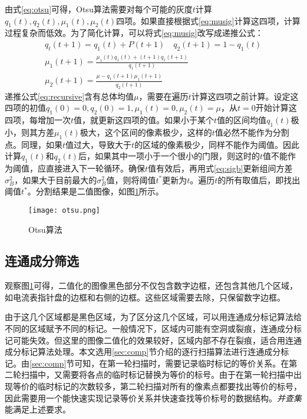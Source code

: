 由式\eqref{eq:otsu}可得，Otsu算法需要对每个可能的灰度$t$计算$q_1(t),q_2(t),\mu_1(t),\mu_2(t)$四项。如果直接根据式\eqref{eq:musig}计算这四项，计算过程复杂而低效。为了简化计算，可以将式\eqref{eq:musig}改写成递推公式：
\begin{equation}
  \label{eq:recursive}
  \begin{aligned}
    q_t(t+1)=q_1(t)+P(t+1)\quad q_2(t+1)=1-q_1(t) \\
    \mu_1(t+1)=\frac{\mu_1(t)q_1(t)+(t+1)q_1(t+1)}{q_1(t+1)} \\
    \mu_2(t+1)=\frac{\mu-q_1(t+1)\mu_1(t+1)}{q_2(t+1)}
  \end{aligned}
\end{equation}
递推公式\eqref{eq:recursive}含有总体均值$\mu$，需要在遍历$t$计算这四项之前计算。设定这四项的初值$q_1(0)=0,q_2(0)=1,\mu_1(t)=0,\mu_2(t)=\mu$，从$t=0$开始计算这四项，每增加一次$t$值，就更新这四项的值。如果小于某个$t$值的区间均值$q_1(t)$极小，则其方差$\mu_1(t)$极大，这个区间的像素极少，这样的$t$值必然不能作为分割点。同理，如果$t$值过大，导致大于$t$的区域的像素极少，同样不能作为阈值。因此计算$q_1(t)$和$q_2(t)$后，如果其中一项小于一个很小的门限，则这时的$t$值不能作为阈值，应直接进入下一轮循环。确保$t$值有效后，再用式\eqref{eq:sigb}更新组间方差$\sigma_B^2$，如果大于目前最大的$\sigma_B^2$值，则将阈值$t^{*}$更新为$t$。遍历$t$的所有取值后，即找出阈值$t^{*}$。分割结果是二值图像，如图\ref{fig:otsu}所示。

\begin{figure}[h]
  \centering
  \texttt{[image: otsu.png]}
  \caption{Otsu算法}
  \label{fig:otsu}
\end{figure}

\subsection{连通成分筛选}

观察图\ref{fig:otsu}可得，二值化的图像黑色部分不仅包含数字边框，还包含其他几个区域，如电流表指针盘的边框和右侧的边框。这些区域需要去除，只保留数字边框。


由于这几个区域都是黑色区域，为了区分这几个区域，可以用连通成分标记算法给不同的区域赋予不同的标记。一般情况下，区域内可能有空洞或裂痕，连通成分标记可能失效。但这里的图像二值化的效果较好，区域内部不存在裂痕，适合用连通成分标记算法处理。本文选用\ref{sec:comp}节介绍的逐行扫描算法进行连通成分标记。由\ref{sec:comp}节可知，在第一轮扫描时，需要记录临时标记的等价关系。在第二轮扫描中，又需要将各点的临时标记替换为等价的标号。由于在第一轮扫描中出现等价的临时标记的次数较多，第二轮扫描对所有的像素点都要找出等价的标号，因此需要用一个能快速实现记录等价关系并快速查找等价标号的数据结构。\emph{并查集}能满足上述要求。

